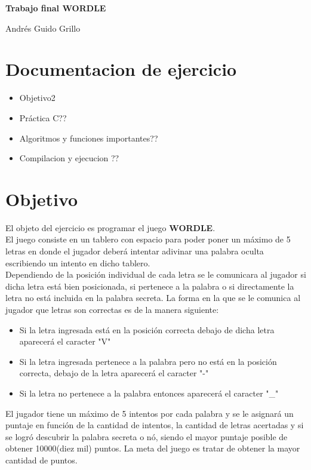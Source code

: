 \documentclass[oneside]{article}
\begin{document}
	\begin{titlepage}
		\vspace*{\fill}		
		\centering
		{\huge \bfseries Trabajo final WORDLE\par}
		\vspace{1cm}
		{\large Andrés Guido Grillo\par}		
		\vfill
	\end{titlepage}
	
	\section*{Documentacion de ejercicio}
	\begin{itemize}
		\item Objetivo\hfill 2
		\item Práctica C\hfill ??
		\item Algoritmos y funciones importantes\hfill ??
		\item Compilacion y ejecucion \hfill ??
	\end{itemize}

	\newpage
	\thispagestyle{fancy}	

	\section*{Objetivo}
	El objeto del ejercicio es programar el juego \textbf{WORDLE}.\\
	El juego consiste en un tablero con espacio para poder poner un máximo de 5 letras en donde el jugador deberá intentar adivinar una palabra oculta escribiendo un intento en dicho tablero.\\
	Dependiendo de la posición individual de cada letra se le comunicara al jugador si dicha letra está bien posicionada, si pertenece a la palabra o si directamente la letra no está incluida en la palabra secreta. La forma en la que se le comunica al jugador que letras son correctas es de la manera siguiente:
	\begin{itemize}
	\item Si la letra ingresada está en la posición correcta debajo de dicha letra aparecerá el caracter "V"
	\item Si la letra ingresada pertenece a la palabra pero no está en la posición correcta, debajo de la letra aparecerá el caracter "-"
	\item Si la letra no pertenece a la palabra entonces aparecerá el caracter "\_"
	\end{itemize}
	El jugador tiene un máximo de 5 intentos por cada palabra y se le asignará un puntaje en función de la cantidad de intentos, la cantidad de letras acertadas y si se logró descubrir la palabra secreta o nó, siendo el mayor puntaje posible de obtener 10000(diez mil) puntos. La meta del juego es tratar de obtener la mayor cantidad de puntos.
	
\end{document}
